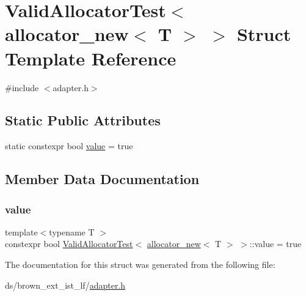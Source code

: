 \hypertarget{structValidAllocatorTest_3_01allocator__new_3_01T_01_4_01_4}{}\section{Valid\+Allocator\+Test$<$ allocator\+\_\+new$<$ T $>$ $>$ Struct Template Reference}
\label{structValidAllocatorTest_3_01allocator__new_3_01T_01_4_01_4}


{\ttfamily \#include $<$adapter.\+h$>$}

\subsection*{Static Public Attributes}
\begin{DoxyCompactItemize}
\item 
static constexpr bool \hyperlink{structValidAllocatorTest_3_01allocator__new_3_01T_01_4_01_4_a7725ab4e2925b9b1f83bc1206690af08}{value} = true
\end{DoxyCompactItemize}


\subsection{Member Data Documentation}
\mbox{\label{structValidAllocatorTest_3_01allocator__new_3_01T_01_4_01_4_a7725ab4e2925b9b1f83bc1206690af08}} 
\subsubsection{\texorpdfstring{value}{value}}
{\footnotesize\ttfamily template$<$typename T $>$ \\
constexpr bool \hyperlink{structValidAllocatorTest}{Valid\+Allocator\+Test}$<$ \hyperlink{classallocator__new}{allocator\+\_\+new}$<$ T $>$ $>$\+::value = true\hspace{0.3cm}{\ttfamily [static]}}



The documentation for this struct was generated from the following file\+:\begin{DoxyCompactItemize}
\item 
ds/brown\+\_\+ext\+\_\+ist\+\_\+lf/\hyperlink{brown__ext__ist__lf_2adapter_8h}{adapter.\+h}\end{DoxyCompactItemize}
